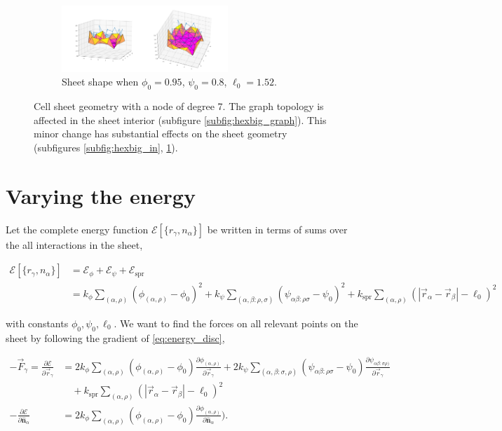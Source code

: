 \documentclass[draft]{article}
\newcommand{\e}{\mathcal{E}}
\newcommand{\bhat}[1]{\hat{\bm{#1}}}
\begin{document}
\begin{figure}[htbp]
\begin{subfigure}[b]{\textwidth}
        \includegraphics[width=0.69\textwidth]{figures/numerical/hexbig/hexbig0.95_0.8_1.35_10_plot.png}
        \caption{Sheet shape when $\phi_0=0.95$, $\psi_0=0.8$, $\ell_0=1.52$.}
        \label{subfig:hexbig_out}
    \end{subfigure}
    \caption{Cell sheet geometry with a node of degree 7. The graph topology is affected in the sheet interior (subfigure \ref{subfig:hexbig_graph}). This minor change has substantial effects on the sheet geometry (subfigures \ref{subfig:hexbig_in}, \ref{subfig:hexbig_out}).}
    \label{fig:hexbig}
\end{figure}

\section{Varying the energy}

Let the complete energy function $\e[\{r_\gamma, n_\alpha\}]$ be written in terms of sums over the all interactions in the sheet,

\begin{align}
	\e[\{r_\gamma, n_\alpha\}] &= \e_\phi + \e_\psi + \e_{\text{spr}} \\
	&= k_\phi \sum_{(\alpha, \rho)} \left( \phi_{(\alpha, \rho)} - \phi_0 \right)^2 + k_\psi \sum_{(\alpha, \beta: \rho, \sigma)} \left( \psi_{\alpha\beta:\rho\sigma} - \psi_0 \right)^2 + k_{\text{spr}} \sum_{(\alpha, \rho)} \left(\left| \vec{r}_\alpha - \vec{r}_\beta \right| - \ell_0 \right)^2 \label{eq:energy_disc}
\end{align}

\noindent with constants $\phi_0, \psi_0, \ell_0$. We want to find the forces on all relevant points on the sheet by following the gradient of \ref{eq:energy_disc}, 

\begin{align}
	-\vec{F}_\gamma = \frac{\partial \e}{\partial \vec{r}_\gamma} &= 2k_\phi \sum_{(\alpha, \rho)} \left( \phi_{(\alpha,\rho)} - \phi_0 \right) \frac{\partial \phi_{(\alpha,\rho)}}{\partial \vec{r}_\gamma} + 2 k_\psi \sum_{(\alpha, \beta: \sigma, \rho)} \left( \psi_{\alpha\beta:\rho\sigma} - \psi_0 \right) \frac{\partial \psi_{\alpha\beta:\sigma\rho)}}{\partial \vec{r}_\gamma} \nonumber \\
	&\quad + k_{\text{spr}} \sum_{(\alpha, \rho)} \left(\left| \vec{r}_\alpha - \vec{r}_\beta \right| - \ell_0 \right)^2 \label{eq:energy_disc_deriv1} \\
	-\frac{\partial \e}{\partial \bhat{n}_\alpha} &= 2k_\phi \sum_{(\alpha, \rho)} \left( \phi_{(\alpha,\rho)} - \phi_0\right) \frac{\partial \phi_{(\alpha, \rho)}}{\partial \bhat{n}_\alpha}). \label{eq:energy_disc_deriv2}
\end{align}
\end{document}
